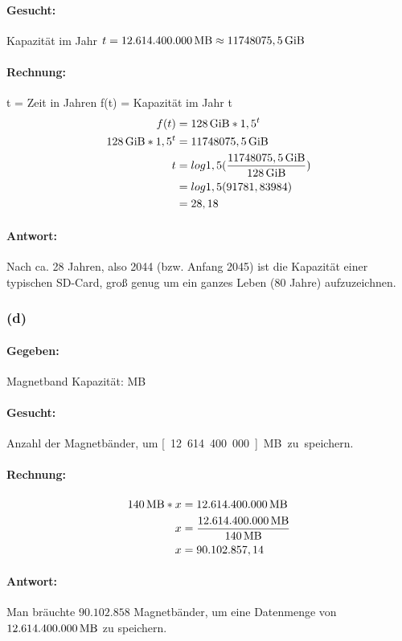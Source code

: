 \documentclass[11pt,a4paper]{article}
\begin{document}
\paragraph{Gesucht:}
    Kapazität im Jahr $t = \unit[12.614.400.000]{MB} \approx \unit[11748075,5]{GiB}$

\paragraph{Rechnung:}
    t = Zeit in Jahren
    f(t) = Kapazität im Jahr t
\begin{align}
    f(t) &= \unit[128]{GiB}*1,5^{t}\\
    \unit[128]{GiB}*1,5^{t} &= \unit[11748075,5]{GiB}\\
    t &= log1,5(\frac{\unit[11748075,5]{GiB}}{\unit[128]{GiB}})\\
      &= log1,5(91781,83984)\\
       &= 28,18\\
\end{align}

\paragraph{Antwort:}
    Nach ca. 28 Jahren, also 2044 (bzw. Anfang 2045) ist die Kapazität einer typischen SD-Card, groß genug um ein ganzes Leben (80 Jahre) aufzuzeichnen.


\subsubsection{(d)} %

\paragraph{Gegeben:}
    Magnetband Kapazität: \unit[140]{MB}

\paragraph{Gesucht:}
    Anzahl der Magnetbänder, um \unit[12.614.400.000]{MB} zu speichern.

\paragraph{Rechnung:}
\begin{align}
    \unit[140]{MB}*x &= \unit[12.614.400.000]{MB}\\
    x &= \frac{\unit[12.614.400.000]{MB}}{\unit[140]{MB}}\\
    x &= 90.102.857,14
\end{align}

\paragraph{Antwort:}
    Man bräuchte $90.102.858$ Magnetbänder, um eine Datenmenge von $\unit[12.614.400.000]{MB}$ zu speichern.


\newpage



\end{document}
